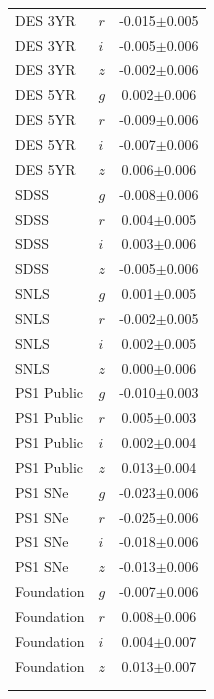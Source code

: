 {\begin{tabular}{llc}
         DES 3YR &      $r$ &   -0.015$\pm$0.005 \\
         DES 3YR &      $i$ &  -0.005$\pm$0.006 \\
         DES 3YR &      $z$ &  -0.002$\pm$0.006 \\
         DES 5YR &      $g$ &   0.002$\pm$0.006 \\
         DES 5YR &      $r$ &  -0.009$\pm$0.006 \\
         DES 5YR &      $i$ &    -0.007$\pm$0.006 \\
         DES 5YR &      $z$ &   0.006$\pm$0.006 \\
            SDSS &      $g$ &  -0.008$\pm$0.006 \\
            SDSS &      $r$ &   0.004$\pm$0.005 \\
            SDSS &      $i$ &   0.003$\pm$0.006 \\
            SDSS &      $z$ &    -0.005$\pm$0.006 \\
            SNLS &      $g$ &   0.001$\pm$0.005 \\
            SNLS &      $r$ &  -0.002$\pm$0.005 \\
            SNLS &      $i$ &   0.002$\pm$0.005 \\
            SNLS &      $z$ &   0.000$\pm$0.006 \\
      PS1 Public &      $g$ &  -0.010$\pm$0.003 \\
      PS1 Public &      $r$ &   0.005$\pm$0.003 \\
      PS1 Public &      $i$ &    0.002$\pm$0.004 \\
      PS1 Public &      $z$ &    0.013$\pm$0.004 \\
         PS1 SNe &      $g$ &   -0.023$\pm$0.006 \\
         PS1 SNe &      $r$ &   -0.025$\pm$0.006 \\
         PS1 SNe &      $i$ &  -0.018$\pm$0.006 \\
         PS1 SNe &      $z$ &  -0.013$\pm$0.006 \\
      Foundation &      $g$ &  -0.007$\pm$0.006 \\
      Foundation &      $r$ &   0.008$\pm$0.006 \\
      Foundation &      $i$ &    0.004$\pm$0.007 \\
      Foundation &      $z$ &   0.013$\pm$0.007 \\

        &       &    \\
        &       &    \\
\hline

\end{tabular}

}